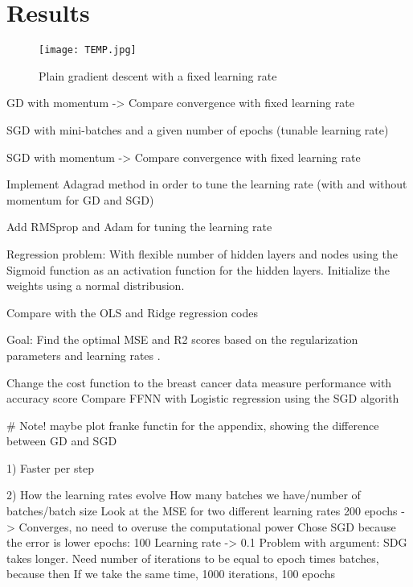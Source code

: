 \documentclass[english,notitlepage,reprint,nofootinbib]{revtex4–2}  %
\begin{document}
\section{Results}\label{sec:results}

\begin{figure}[h!]
    \centering %
    \texttt{[image: TEMP.jpg]} %
    \caption{Plain gradient descent with a fixed learning rate}
    \label{fig: TEMP}
\end{figure}

\item GD with momentum -> Compare convergence with fixed learning rate 
\item SGD with mini-batches and a given number of epochs (tunable learning rate) 
\item SGD with momentum -> Compare convergence with fixed learning rate 
\item Implement Adagrad method in order to tune the learning rate (with and without momentum for GD and SGD) 
\item Add RMSprop and Adam for tuning the learning rate 

\item Regression problem: With flexible number of hidden layers and nodes using the Sigmoid function as an activation function for the hidden layers. Initialize the weights using a normal distribusion. 
\item Compare with the OLS and Ridge regression codes 

Goal: Find the optimal MSE and R2 scores based on the regularization parameters and learning rates .

Change the cost function to the breast cancer data 
measure performance with accuracy score 
Compare FFNN with Logistic regression using the SGD algorith 

# Note! maybe plot franke functin for the appendix, showing the difference between GD and SGD 

1) 
Faster per step 

2) How the learning rates evolve 
How many batches we have/number of batches/batch size 
Look at the MSE for two different learning rates 
200 epochs -> Converges, no need to overuse the computational power 
Chose SGD because the error is lower 
epochs: 100 
Learning rate -> 0.1 
Problem with argument: SDG takes longer. Need number of iterations to be equal to epoch times batches, because then 
If we take the same time, 1000 iterations, 100 epochs 
\end{document}
